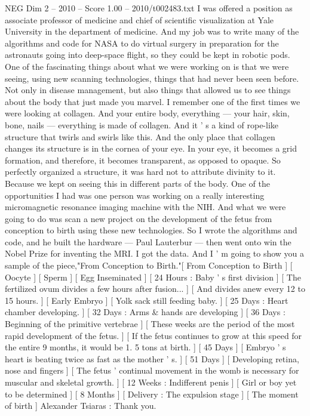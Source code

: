 \begin{textsample}{NEG Dim 2 – 2010 – Score 1.00 – 2010/t002483.txt}  \label{ex:f2_neg_020}
I was offered a position as associate professor of medicine and chief of scientific visualization at Yale University in the department of medicine.
And my job was to write many of the algorithms and code for NASA to do virtual surgery in preparation for the astronauts going into deep-space flight, so they could be kept in robotic pods.
One of the fascinating things about what we were working on is that we were seeing, using new scanning technologies, things that had never been seen before.
Not only in disease management, but also things that allowed us to see things about the body that just made you marvel.
I remember one of the first times we were looking at collagen.
And your entire body, everything — your hair, skin, bone, nails — everything is made of collagen.
And it ' s a kind of rope-like structure that twirls and swirls like this.
And the only place that collagen changes its structure is in the cornea of your eye.
In your eye, it becomes a grid formation, and therefore, it becomes transparent, as opposed to opaque.
So perfectly organized a structure, it was hard not to attribute divinity to it.
Because we kept on seeing this in different parts of the body.
One of the opportunities I had was one person was working on a really interesting micromagnetic resonance imaging machine with the NIH.
And what we were going to do was scan a new project on the development of the fetus from conception to birth using these new technologies.
So I wrote the algorithms and code, and he built the hardware — Paul Lauterbur — then went onto win the Nobel Prize for inventing the MRI.
I got the data.
And I ' m going to show you a sample of the piece,"From Conception to Birth."[ From Conception to Birth ] [ Oocyte ] [ Sperm ] [ Egg Inseminated ] [ 24 Hours : Baby ' s first division ] [ The fertilized ovum divides a few hours after fusion... ] [ And divides anew every 12 to 15 hours. ] [ Early Embryo ] [ Yolk sack still feeding baby. ] [ 25 Days : Heart chamber developing. ] [ 32 Days : Arms \& hands are developing ] [ 36 Days : Beginning of the primitive vertebrae ] [ These weeks are the period of the most rapid development of the fetus. ] [ If the fetus continues to grow at this speed for the entire 9 months, it would be 1. 5 tons at birth. ] [ 45 Days ] [ Embryo ' s heart is beating twice as fast as the mother ' s. ] [ 51 Days ] [ Developing retina, nose and fingers ] [ The fetus ' continual movement in the womb is necessary for muscular and skeletal growth. ] [ 12 Weeks : Indifferent penis ] [ Girl or boy yet to be determined ] [ 8 Months ] [ Delivery : The expulsion stage ] [ The moment of birth ] Alexander Tsiaras : Thank you.

\end{textsample}
